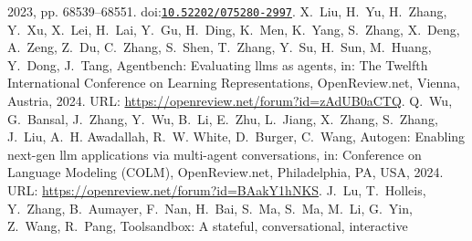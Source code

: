 \documentclass[10pt,a4paper]{article}
\providecommand{\bibinfo}[2]{#2}
\providecommand{\DOIprefix}{doi:}
\providecommand{\URLprefix}{URL: }
\providecommand{\doi}[1]{\href{https://doi.org/#1}{\nolinkurl{#1}}}
\begin{document}
\begin{thebibliography}{24}
  \bibinfo{year}{2023}, pp. \bibinfo{pages}{68539--68551}.
  \DOIprefix\doi{10.52202/075280-2997}.
\bibinfo{author}{X.~Liu}, \bibinfo{author}{H.~Yu}, \bibinfo{author}{H.~Zhang},
  \bibinfo{author}{Y.~Xu}, \bibinfo{author}{X.~Lei}, \bibinfo{author}{H.~Lai},
  \bibinfo{author}{Y.~Gu}, \bibinfo{author}{H.~Ding}, \bibinfo{author}{K.~Men},
  \bibinfo{author}{K.~Yang}, \bibinfo{author}{S.~Zhang},
  \bibinfo{author}{X.~Deng}, \bibinfo{author}{A.~Zeng},
  \bibinfo{author}{Z.~Du}, \bibinfo{author}{C.~Zhang},
  \bibinfo{author}{S.~Shen}, \bibinfo{author}{T.~Zhang},
  \bibinfo{author}{Y.~Su}, \bibinfo{author}{H.~Sun},
  \bibinfo{author}{M.~Huang}, \bibinfo{author}{Y.~Dong},
  \bibinfo{author}{J.~Tang},
\newblock \bibinfo{title}{Agentbench: Evaluating llms as agents},
\newblock in: \bibinfo{booktitle}{The Twelfth International Conference on
  Learning Representations}, \bibinfo{publisher}{OpenReview.net},
  \bibinfo{address}{Vienna, Austria}, \bibinfo{year}{2024}. \URLprefix
  \url{https://openreview.net/forum?id=zAdUB0aCTQ}.
\bibinfo{author}{Q.~Wu}, \bibinfo{author}{G.~Bansal},
  \bibinfo{author}{J.~Zhang}, \bibinfo{author}{Y.~Wu}, \bibinfo{author}{B.~Li},
  \bibinfo{author}{E.~Zhu}, \bibinfo{author}{L.~Jiang},
  \bibinfo{author}{X.~Zhang}, \bibinfo{author}{S.~Zhang},
  \bibinfo{author}{J.~Liu}, \bibinfo{author}{A.~H. Awadallah},
  \bibinfo{author}{R.~W. White}, \bibinfo{author}{D.~Burger},
  \bibinfo{author}{C.~Wang},
\newblock \bibinfo{title}{Autogen: Enabling next-gen llm applications via
  multi-agent conversations},
\newblock in: \bibinfo{booktitle}{Conference on Language Modeling (COLM)},
  \bibinfo{publisher}{OpenReview.net}, \bibinfo{address}{Philadelphia, PA,
  USA}, \bibinfo{year}{2024}. \URLprefix
  \url{https://openreview.net/forum?id=BAakY1hNKS}.
\bibinfo{author}{J.~Lu}, \bibinfo{author}{T.~Holleis},
  \bibinfo{author}{Y.~Zhang}, \bibinfo{author}{B.~Aumayer},
  \bibinfo{author}{F.~Nan}, \bibinfo{author}{H.~Bai}, \bibinfo{author}{S.~Ma},
  \bibinfo{author}{S.~Ma}, \bibinfo{author}{M.~Li}, \bibinfo{author}{G.~Yin},
  \bibinfo{author}{Z.~Wang}, \bibinfo{author}{R.~Pang},
\newblock \bibinfo{title}{Toolsandbox: A stateful, conversational, interactive
}
\end{thebibliography}
\end{document}
